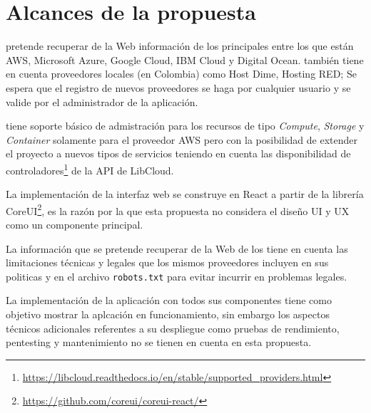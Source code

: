 \chapter{Alcances de la propuesta} %

\label{ch:alcances} %



\appName pretende recuperar de la Web información de los principales  entre los que están \acrshort{AWS}, \gls{Microsoft Azure}, \gls{Google Cloud}, \gls{IBM Cloud} y \gls{Digital Ocean}. \appName también tiene en cuenta proveedores locales (en Colombia) como \gls{Host Dime}, \gls{Hosting RED}; Se espera que el registro de nuevos proveedores se haga por cualquier usuario y se valide por el administrador de la aplicación.\bigskip

\appName tiene soporte básico de admistración para los recursos de tipo \emph{Compute}, \emph{Storage} y \emph{Container} solamente para el proveedor \acrshort{AWS} pero con la posibilidad de extender el proyecto a nuevos tipos de servicios teniendo en cuenta las disponibilidad de controladores\footnote{\url{https://libcloud.readthedocs.io/en/stable/supported_providers.html}} de la API de \gls{LibCloud}. \bigskip

La implementación de la interfaz web se construye en \gls{React} a partir de la librería \gls{CoreUI}\footnote{\url{https://github.com/coreui/coreui-react/}}, es la razón por la que esta propuesta no considera el diseño \acrshort{UI} y \acrshort{UX} como un componente principal.\bigskip

La información que se pretende recuperar de la Web de los  tiene en cuenta las limitaciones técnicas y legales que los mismos proveedores incluyen en sus politicas y en el archivo \texttt{robots.txt} para evitar incurrir en problemas legales. \bigskip

La implementación de la aplicación con todos sus componentes tiene como objetivo mostrar la aplcación en funcionamiento, sin embargo los aspectos técnicos adicionales referentes a su despliegue como pruebas de rendimiento, pentesting y mantenimiento no se tienen en cuenta en esta propuesta.